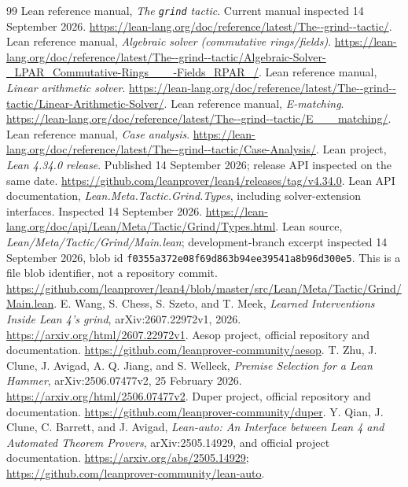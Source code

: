 \documentclass[11pt,letterpaper]{article}
\newcommand{\code}[1]{\texttt{#1}}
\theoremstyle{definition}\newtheorem{definition}[theorem]{Definition}
\theoremstyle{remark}\newtheorem{remark}[theorem]{Remark}
\begin{document}
\begin{thebibliography}{99}
\small
{} Lean reference manual, \emph{The \code{grind} tactic}. Current manual inspected 14 September 2026. \url{https://lean-lang.org/doc/reference/latest/The--grind--tactic/}.
 Lean reference manual, \emph{Algebraic solver (commutative rings/fields)}. \url{https://lean-lang.org/doc/reference/latest/The--grind--tactic/Algebraic-Solver-_LPAR_Commutative-Rings___-Fields_RPAR_/}.
 Lean reference manual, \emph{Linear arithmetic solver}. \url{https://lean-lang.org/doc/reference/latest/The--grind--tactic/Linear-Arithmetic-Solver/}.
 Lean reference manual, \emph{E-matching}. \url{https://lean-lang.org/doc/reference/latest/The--grind--tactic/E___matching/}.
 Lean reference manual, \emph{Case analysis}. \url{https://lean-lang.org/doc/reference/latest/The--grind--tactic/Case-Analysis/}.
 Lean project, \emph{Lean 4.34.0 release}. Published 14 September 2026; release API inspected on the same date. \url{https://github.com/leanprover/lean4/releases/tag/v4.34.0}.
 Lean API documentation, \emph{Lean.Meta.Tactic.Grind.Types}, including solver-extension interfaces. Inspected 14 September 2026. \url{https://lean-lang.org/doc/api/Lean/Meta/Tactic/Grind/Types.html}.
 Lean source, \emph{Lean/Meta/Tactic/Grind/Main.lean}; development-branch excerpt inspected 14 September 2026, blob id \code{f0355a372e08f69d863b94ee39541a8b96d300e5}. This is a file blob identifier, not a repository commit. \url{https://github.com/leanprover/lean4/blob/master/src/Lean/Meta/Tactic/Grind/Main.lean}.
 E. Wang, S. Chess, S. Szeto, and T. Meek, \emph{Learned Interventions Inside Lean 4's grind}, arXiv:2607.22972v1, 2026. \url{https://arxiv.org/html/2607.22972v1}.
 Aesop project, official repository and documentation. \url{https://github.com/leanprover-community/aesop}.
 T. Zhu, J. Clune, J. Avigad, A. Q. Jiang, and S. Welleck, \emph{Premise Selection for a Lean Hammer}, arXiv:2506.07477v2, 25 February 2026. \url{https://arxiv.org/html/2506.07477v2}.
 Duper project, official repository and documentation. \url{https://github.com/leanprover-community/duper}.
 Y. Qian, J. Clune, C. Barrett, and J. Avigad, \emph{Lean-auto: An Interface between Lean 4 and Automated Theorem Provers}, arXiv:2505.14929, and official project documentation. \url{https://arxiv.org/abs/2505.14929}; \url{https://github.com/leanprover-community/lean-auto}.

\end{thebibliography}
\end{document}
